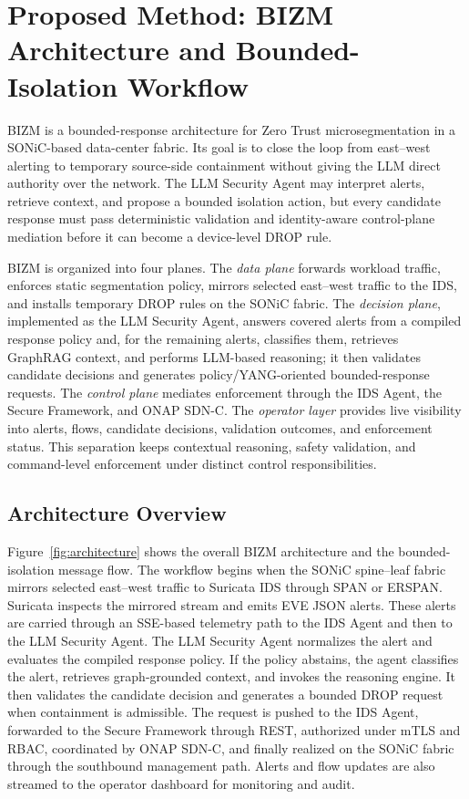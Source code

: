 \documentclass[final,5p]{elsarticle}
\begin{document}
\section{Proposed Method: BIZM Architecture and Bounded-Isolation Workflow}
\label{sec:method}

BIZM is a bounded-response architecture for Zero Trust microsegmentation in a SONiC-based data-center fabric. Its goal is to close the loop from east--west alerting to temporary source-side containment without giving the LLM direct authority over the network. The LLM Security Agent may interpret alerts, retrieve context, and propose a bounded isolation action, but every candidate response must pass deterministic validation and identity-aware control-plane mediation before it can become a device-level DROP rule.

BIZM is organized into four planes. The \emph{data plane} forwards workload traffic, enforces static segmentation policy, mirrors selected east--west traffic to the IDS, and installs temporary DROP rules on the SONiC fabric. The \emph{decision plane}, implemented as the LLM Security Agent, answers covered alerts from a compiled response policy and, for the remaining alerts, classifies them, retrieves GraphRAG context, and performs LLM-based reasoning; it then validates candidate decisions and generates policy/YANG-oriented bounded-response requests. The \emph{control plane} mediates enforcement through the IDS Agent, the Secure Framework, and ONAP SDN-C. The \emph{operator layer} provides live visibility into alerts, flows, candidate decisions, validation outcomes, and enforcement status. This separation keeps contextual reasoning, safety validation, and command-level enforcement under distinct control responsibilities.

\subsection{Architecture Overview}
\label{sec:arch_overview}

Figure~\ref{fig:architecture} shows the overall BIZM architecture and the bounded-isolation message flow. The workflow begins when the SONiC spine--leaf fabric mirrors selected east--west traffic to Suricata IDS through SPAN or ERSPAN. Suricata inspects the mirrored stream and emits EVE JSON alerts. These alerts are carried through an SSE-based telemetry path to the IDS Agent and then to the LLM Security Agent. The LLM Security Agent normalizes the alert and evaluates the compiled response policy. If the policy abstains, the agent classifies the alert, retrieves graph-grounded context, and invokes the reasoning engine. It then validates the candidate decision and generates a bounded DROP request when containment is admissible. The request is pushed to the IDS Agent, forwarded to the Secure Framework through REST, authorized under mTLS and RBAC, coordinated by ONAP SDN-C, and finally realized on the SONiC fabric through the southbound management path. Alerts and flow updates are also streamed to the operator dashboard for monitoring and audit.
\end{document}
